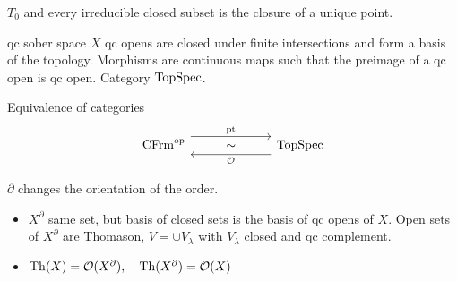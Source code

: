 \begin{definition} $T_0$ and every irreducible closed subset is the closure of a unique point.
\end{definition}

\begin{definition} qc sober space $X$ qc opens are closed under finite intersections and form a basis of the topology. Morphisms are continuous maps such that the preimage of a qc open is qc open. Category $\operatorname{TopSpec}$.
\end{definition}

\begin{theorem} Equivalence of categories
\[\begin{tikzcd}
	{\CFrm^{\text{op}}} & \sim & \TopSpec
	\arrow["{\text{pt}}", shift left=3, from=1-1, to=1-3]
	\arrow["{\mathcal{O}}", shift left=3, from=1-3, to=1-1]
\end{tikzcd}\]
\end{theorem}

\begin{definition} $ \partial $ changes the orientation of the order. 
\begin{itemize}[topsep=-6pt, itemsep=0pt]
    \item $X^{\partial}$ same set, but basis of closed sets is the basis of qc opens of $X$. Open sets of $X^{\partial}$ are Thomason, $V = \cup V_\lambda $ with $V_{\lambda}$ closed and qc complement.
    \item $\operatorname{Th}(X) = \mathcal{O}(X^{\partial}), \quad  \operatorname{Th}(X^{\partial }) = \mathcal{O}(X) $ 
\end{itemize}
\end{definition}



